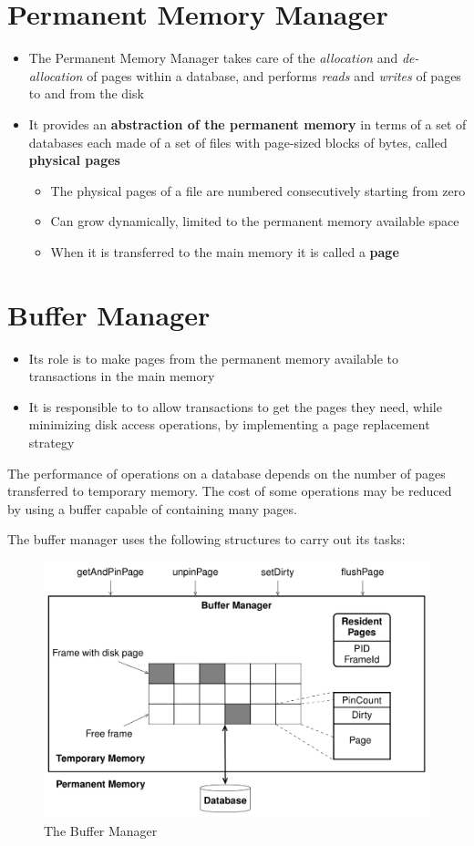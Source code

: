 \section{Permanent Memory Manager}
\begin{itemize}
    \item The Permanent Memory Manager takes care of the \textit{allocation} and \textit{de-allocation} of pages within a database, and performs \textit{reads} and \textit{writes} of pages to and from the disk
    \item It provides an \textbf{abstraction of the permanent memory} in terms of a set of databases each made of a set of files with page-sized blocks of bytes, called \textbf{physical pages}
    \begin{itemize}
        \item The physical pages of a file are numbered consecutively starting from zero
        \item Can grow dynamically, limited to the permanent memory available space
        \item When it is transferred to the main memory it is called a \textbf{page}
    \end{itemize}
\end{itemize}

\newpage
\section{Buffer Manager}
\begin{itemize}
    \item Its role is to make pages from the permanent memory available to transactions in the main memory
    \item It is responsible to to allow transactions to get the pages they need, while minimizing disk access operations, by implementing a page replacement strategy
\end{itemize}
The performance of operations on a database depends on the number of pages transferred to temporary memory. The cost of some operations may be reduced by using a buffer capable of containing many pages.


The buffer manager uses the following structures to carry out its tasks:
\begin{figure}[!h]
        \centering
        \includegraphics[width=0.7\linewidth]{images/DBMS_Internals/bufgfer_managment.jpeg}
        \caption{The Buffer Manager}
    \end{figure}
    
